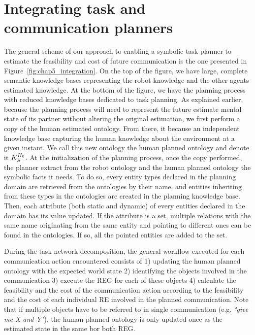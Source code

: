 \section[Integrating planners]{Integrating task and communication planners}

The general scheme of our approach to enabling a symbolic task planner to estimate the feasibility and cost of future communication is the one presented in Figure~\ref{fig:chap5_integration}. On the top of the figure, we have large, complete semantic knowledge bases representing the robot knowledge and the other agents estimated knowledge. At the bottom of the figure, we have the planning process with reduced knowledge bases dedicated to task planning. As explained earlier, because the planning process will need to represent the future estimate mental state of its partner without altering the original estimation, we first perform a copy of the human estimated ontology. From there, it because an independent knowledge base capturing the human knowledge about the environment at a given instant. We call this new ontology the human planned ontology and denote it $K_S^{H_0}$. At the initialization of the planning process, once the copy performed, the planner extract from the robot ontology and the human planned ontology the symbolic facts it needs. To do so, every entity types declared in the planning domain are retrieved from the ontologies by their name, and entities inheriting from these types in the ontologies are created in the planning knowledge base. Then, each attribute (both static and dynamic) of every entities declared in the domain has its value updated. If the attribute is a set, multiple relations with the same name originating from the same entity and pointing to different ones can be found in the ontologies. If so, all the pointed entities are added to the set.

During the task network decomposition, the general workflow executed for each communication action encountered consists of 1) updating the human planned ontology with the expected world state 2) identifying the objects involved in the communication 3) execute the REG for each of these objects 4) calculate the feasibility and the cost of the communication action according to the feasibility and the cost of each individual RE involved in the planned communication. Note that if multiple objects have to be referred to in single communication (e.g. \textit{"give me X and Y"}), the human planned ontology is only updated once as the estimated state in the same bor both REG.

